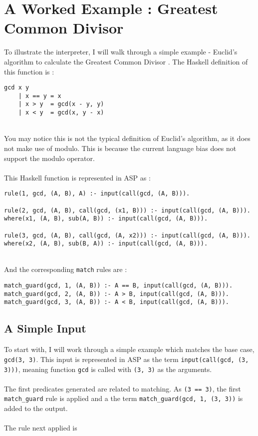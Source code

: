 \section{A Worked Example : Greatest Common Divisor}

To illustrate the interpreter, I will walk through a simple example - Euclid's algorithm to calculate the Greatest Common Divisor \cite{Euclid}. The Haskell definition of this function is : \\

\begin{lstlisting}
gcd x y
	| x == y = x
	| x > y  = gcd(x - y, y)
	| x < y  = gcd(x, y - x)
\end{lstlisting}
\mbox{} \\
You may notice this is not the typical definition of Euclid's algorithm, as it does not make use of modulo. This is because the current language bias does not support the modulo operator. \\ \\
This Haskell function is represented in ASP as :\\

\begin{lstlisting}
rule(1, gcd, (A, B), A) :- input(call(gcd, (A, B))).

rule(2, gcd, (A, B), call(gcd, (x1, B))) :- input(call(gcd, (A, B))).
where(x1, (A, B), sub(A, B)) :- input(call(gcd, (A, B))).

rule(3, gcd, (A, B), call(gcd, (A, x2))) :- input(call(gcd, (A, B))).
where(x2, (A, B), sub(B, A)) :- input(call(gcd, (A, B))).
\end{lstlisting}
\mbox{} \\
And the corresponding \lstinline{match} rules are :\\ %

\begin{lstlisting}
match_guard(gcd, 1, (A, B)) :- A == B, input(call(gcd, (A, B))).
match_guard(gcd, 2, (A, B)) :- A > B, input(call(gcd, (A, B))).
match_guard(gcd, 3, (A, B)) :- A < B, input(call(gcd, (A, B))).
\end{lstlisting}

\subsection{A Simple Input}
To start with, I will work through a simple example which matches the base case, \lstinline{gcd(3, 3)}. This input is represented in ASP as the term \lstinline{input(call(gcd, (3, 3)))}, meaning function \lstinline{gcd} is called with \lstinline{(3, 3)} as the arguments. \\ \\
The first predicates generated are related to matching. As \lstinline{(3 == 3)}, the first \lstinline{match_guard} rule is applied and a the term \lstinline{match_guard(gcd, 1, (3, 3))} is added to the output.\\ \\ %
The rule next applied is \\

